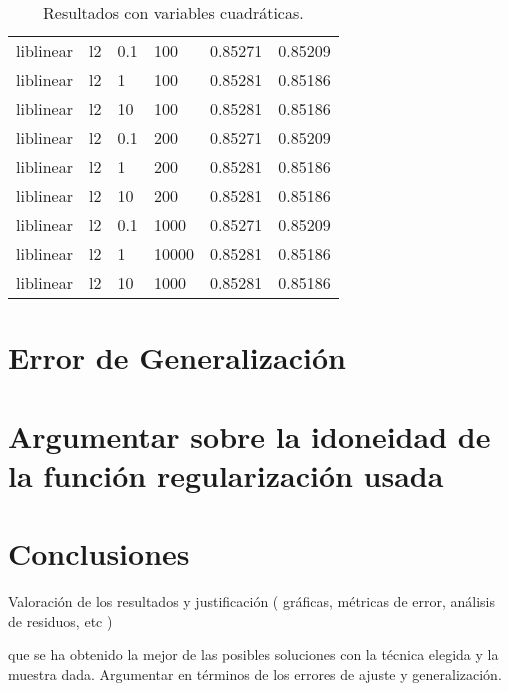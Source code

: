 \documentclass[11pt,a4paper]{article}
\begin{document}
\begin{table}[h]
\begin{center}
\begin{tabular}{|l|l|l|l|l|l|}
liblinear & l2 & 0.1 & 100 & 0.85271 & 0.85209\\

liblinear & l2 & 1  &100  & 0.85281 & 0.85186\\

liblinear & l2 & 10 & 100 & 0.85281 & 0.85186\\

liblinear & l2 & 0.1 & 200 & 0.85271 & 0.85209\\

liblinear & l2 & 1 & 200 & 0.85281 & 0.85186\\

liblinear & l2 & 10  &200  & 0.85281 & 0.85186\\

liblinear & l2 & 0.1 & 1000 & 0.85271 & 0.85209\\

liblinear & l2 & 1 & 10000  & 0.85281 & 0.85186\\

liblinear & l2 & 10 & 1000 & 0.85281 & 0.85186\\ \hline

\end{tabular}
\end{center}
\caption{Resultados con variables cuadráticas.}
	\end{table}

\newpage
\section{ Error de Generalización}
\section{ Argumentar sobre la idoneidad de la función regularización usada }
\section{ Conclusiones }
Valoración de los resultados y justificación
( gráficas, métricas de error, análisis de residuos, etc )


que se ha obtenido la mejor de las posibles soluciones con la técnica elegida y la muestra dada. Argumentar en términos de los errores de ajuste y generalización. 
\end{document}
